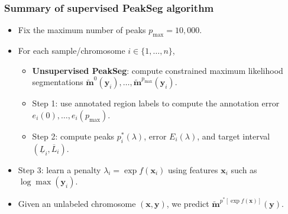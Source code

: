 \documentclass{beamer}
\begin{document}
\begin{frame}
  \frametitle{Summary of supervised PeakSeg 
     algorithm}
  \begin{itemize}
  \item Fix the maximum number of peaks $p_{\text{max}} = 10,000$.
  \item For each sample/chromosome $i\in\{1,\dots, n\}$,
    \begin{itemize}
    \item \textbf{Unsupervised PeakSeg}: compute constrained maximum likelihood
      segmentations $\mathbf{\tilde m}^0(\mathbf y_i), \dots,
      \mathbf{\tilde m}^{p_{\text{max}}}(\mathbf y_i)$.
    \item Step 1: use annotated region labels to compute the
      annotation error $e_i(0), \dots, e_i(p_{\text{max}})$.
    \item Step 2: compute peaks $p_i^*(\lambda)$, error
      $E_i(\lambda)$, and target interval $(\underline L_i, \overline
      L_i)$.
    \end{itemize}
  \item  Step 3:  learn a  penalty $\lambda_i  = \exp  f(\mathbf x_i)$
    using features $\mathbf x_i$ such as $\log \max(\mathbf y_i)$.
  \item Given an unlabeled chromosome $(\mathbf x, \mathbf y)$, we predict
    $\mathbf{ \tilde m}^{p^*\left[
        \exp f(\mathbf x)
      \right]}(\mathbf y)$.
  \end{itemize}
\end{frame}
\end{document}

